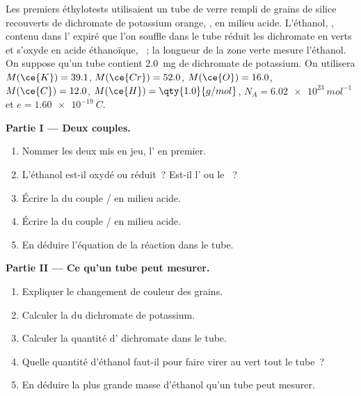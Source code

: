 \begin{problem}
\label{pb:g11:redox:1}
Les premiers éthylotests utilisaient un tube de verre rempli de grains
de silice recouverts de dichromate de potassium orange, , en
milieu acide. L'éthanol, , contenu dans l' expiré que
l'on souffle dans le tube réduit les  dichromate en  
verts et s'oxyde en acide éthanoïque, ~; la longueur de la
zone verte mesure l'éthanol. On suppose qu'un tube contient
\qty{2.0}{mg} de dichromate de potassium. On utilisera
$M(\ce{K}) = 39.1$, $M(\ce{Cr}) = 52.0$, $M(\ce{O}) = 16.0$,
$M(\ce{C}) = 12.0$, $M(\ce{H}) = \qty{1.0}{g/mol}$, $N_A =
\qty{6.02e23}{mol^{-1}}$ et $e = \qty{1.60e-19}{C}$.

\medskip
\noindent\textbf{Partie I --- Deux couples.}
\begin{enumerate}
  \item Nommer les deux  mis en jeu, l'
        en premier.
  \item L'éthanol est-il oxydé ou réduit~? Est-il l' ou le
        ~?
  \item Écrire la  du couple /
        en milieu acide.
  \item Écrire la  du couple / en
        milieu acide.
  \item En déduire l'équation de la réaction dans le tube.
\end{enumerate}

\medskip
\noindent\textbf{Partie II --- Ce qu'un tube peut mesurer.}
\begin{enumerate}[resume]
  \item Expliquer le changement de couleur des grains.
  \item Calculer la  du dichromate de potassium.
  \item Calculer la quantité d' dichromate dans le tube.
  \item Quelle quantité d'éthanol faut-il pour faire virer au vert tout
        le tube~?
  \item En déduire la plus grande masse d'éthanol qu'un tube peut
        mesurer.
\end{enumerate}


\end{problem}
